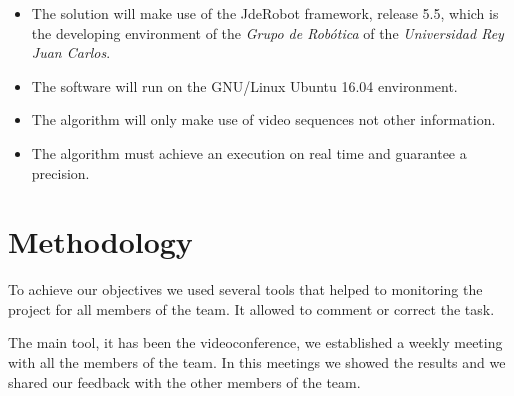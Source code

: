 \begin{itemize}

\item The solution will make use of the JdeRobot framework, release 5.5, which is the developing environment of the \textit{Grupo de Robótica} of the \textit{Universidad Rey Juan Carlos}.

\item The software will run on the GNU/Linux Ubuntu 16.04 environment.

\item The algorithm will only make use of video sequences not other information.

\item The algorithm must achieve an execution on real time and guarantee a precision.


\end{itemize}

%
%
%
%
%
%
%
%



\section{Methodology}

To achieve our objectives we used several tools that helped to monitoring the project for all members of the team. It allowed to comment or correct the task.

The main tool, it has been the videoconference, we established a weekly meeting with all the members of the team. In this meetings we showed the results and we shared our feedback with the other members of the team. 

